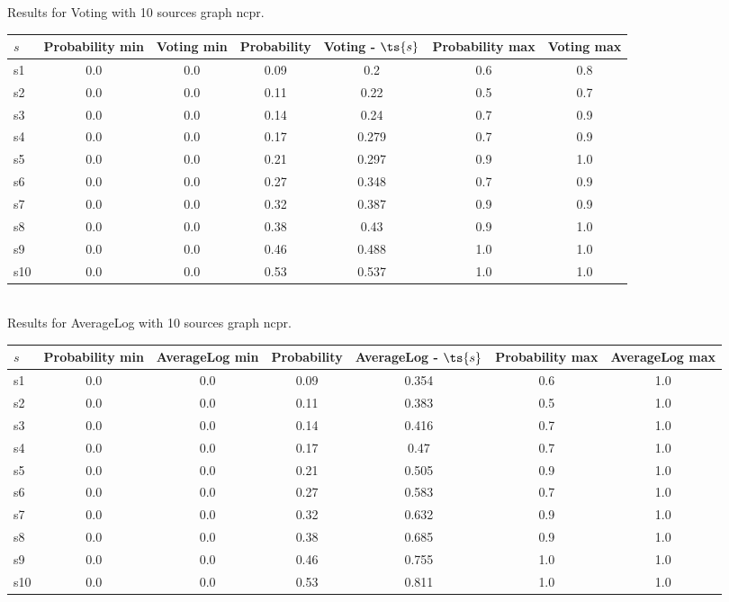 \documentclass{article}
\begin{document}
\noindent Results for Voting with 10 sources graph ncpr.

\noindent\begin{tabular}{|l|c|c|c|c|c|c|}
\hline
$s$& Probability min & Voting min & Probability & Voting - $\ts{s}$ & Probability max & Voting max\\
\hline
s1 &0.0 & 0.0 & 0.09 & 0.2 & 0.6 & 0.8\\
\hline
s2 &0.0 & 0.0 & 0.11 & 0.22 & 0.5 & 0.7\\
\hline
s3 &0.0 & 0.0 & 0.14 & 0.24 & 0.7 & 0.9\\
\hline
s4 &0.0 & 0.0 & 0.17 & 0.279 & 0.7 & 0.9\\
\hline
s5 &0.0 & 0.0 & 0.21 & 0.297 & 0.9 & 1.0\\
\hline
s6 &0.0 & 0.0 & 0.27 & 0.348 & 0.7 & 0.9\\
\hline
s7 &0.0 & 0.0 & 0.32 & 0.387 & 0.9 & 0.9\\
\hline
s8 &0.0 & 0.0 & 0.38 & 0.43 & 0.9 & 1.0\\
\hline
s9 &0.0 & 0.0 & 0.46 & 0.488 & 1.0 & 1.0\\
\hline
s10 &0.0 & 0.0 & 0.53 & 0.537 & 1.0 & 1.0\\
\hline
\end{tabular}\\

\noindent Results for AverageLog with 10 sources graph ncpr.

\noindent\begin{tabular}{|l|c|c|c|c|c|c|}
\hline
$s$& Probability min & AverageLog min & Probability & AverageLog - $\ts{s}$ & Probability max & AverageLog max\\
\hline
s1 &0.0 & 0.0 & 0.09 & 0.354 & 0.6 & 1.0\\
\hline
s2 &0.0 & 0.0 & 0.11 & 0.383 & 0.5 & 1.0\\
\hline
s3 &0.0 & 0.0 & 0.14 & 0.416 & 0.7 & 1.0\\
\hline
s4 &0.0 & 0.0 & 0.17 & 0.47 & 0.7 & 1.0\\
\hline
s5 &0.0 & 0.0 & 0.21 & 0.505 & 0.9 & 1.0\\
\hline
s6 &0.0 & 0.0 & 0.27 & 0.583 & 0.7 & 1.0\\
\hline
s7 &0.0 & 0.0 & 0.32 & 0.632 & 0.9 & 1.0\\
\hline
s8 &0.0 & 0.0 & 0.38 & 0.685 & 0.9 & 1.0\\
\hline
s9 &0.0 & 0.0 & 0.46 & 0.755 & 1.0 & 1.0\\
\hline
s10 &0.0 & 0.0 & 0.53 & 0.811 & 1.0 & 1.0\\
\hline
\end{tabular}\\
\end{document}
